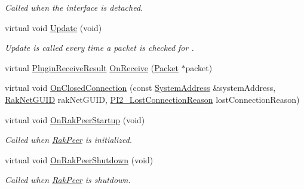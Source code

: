 \begin{DoxyCompactItemize}
\begin{DoxyCompactList}\small\item\em Called when the interface is detached. \end{DoxyCompactList}\item 
\hypertarget{class_rak_net_1_1_u_d_p_proxy_server_a1e6a78a82faae30bb6b33e1cd994e846}{virtual void \hyperlink{class_rak_net_1_1_u_d_p_proxy_server_a1e6a78a82faae30bb6b33e1cd994e846}{Update} (void)}\label{class_rak_net_1_1_u_d_p_proxy_server_a1e6a78a82faae30bb6b33e1cd994e846}

\begin{DoxyCompactList}\small\item\em Update is called every time a packet is checked for . \end{DoxyCompactList}\item 
virtual \hyperlink{group___p_l_u_g_i_n___i_n_t_e_r_f_a_c_e___g_r_o_u_p_ga89998adaafb29e5d879113b992161085}{Plugin\-Receive\-Result} \hyperlink{class_rak_net_1_1_u_d_p_proxy_server_a051c38b321e54ba658b2e3eb2224940e}{On\-Receive} (\hyperlink{struct_rak_net_1_1_packet}{Packet} $\ast$packet)
\item 
virtual void \hyperlink{class_rak_net_1_1_u_d_p_proxy_server_a39620eefb2fdb1a1811880d872ce87d0}{On\-Closed\-Connection} (const \hyperlink{struct_rak_net_1_1_system_address}{System\-Address} \&system\-Address, \hyperlink{struct_rak_net_1_1_rak_net_g_u_i_d}{Rak\-Net\-G\-U\-I\-D} rak\-Net\-G\-U\-I\-D, \hyperlink{group___p_l_u_g_i_n___i_n_t_e_r_f_a_c_e___g_r_o_u_p_ga376cc546fd6892c2ead48cd51796c8b8}{P\-I2\-\_\-\-Lost\-Connection\-Reason} lost\-Connection\-Reason)
\item 
\hypertarget{class_rak_net_1_1_u_d_p_proxy_server_a80f7ee5d6e821cd0653cc28502db4666}{virtual void \hyperlink{class_rak_net_1_1_u_d_p_proxy_server_a80f7ee5d6e821cd0653cc28502db4666}{On\-Rak\-Peer\-Startup} (void)}\label{class_rak_net_1_1_u_d_p_proxy_server_a80f7ee5d6e821cd0653cc28502db4666}

\begin{DoxyCompactList}\small\item\em Called when \hyperlink{class_rak_net_1_1_rak_peer}{Rak\-Peer} is initialized. \end{DoxyCompactList}\item 
\hypertarget{class_rak_net_1_1_u_d_p_proxy_server_a91a6d428437c2adc9079a35785eb3abc}{virtual void \hyperlink{class_rak_net_1_1_u_d_p_proxy_server_a91a6d428437c2adc9079a35785eb3abc}{On\-Rak\-Peer\-Shutdown} (void)}\label{class_rak_net_1_1_u_d_p_proxy_server_a91a6d428437c2adc9079a35785eb3abc}

\begin{DoxyCompactList}\small\item\em Called when \hyperlink{class_rak_net_1_1_rak_peer}{Rak\-Peer} is shutdown. \end{DoxyCompactList}\end{DoxyCompactItemize}
